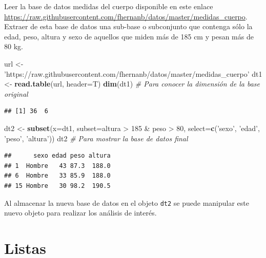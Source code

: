 \documentclass[10pt,]{krantz}
\makeatletter
\newenvironment{Shaded}{\begin{snugshade}}{\end{snugshade}}
\newcommand{\KeywordTok}[1]{\textcolor[rgb]{0.13,0.29,0.53}{\textbf{{#1}}}}
\newcommand{\DataTypeTok}[1]{\textcolor[rgb]{0.13,0.29,0.53}{{#1}}}
\newcommand{\DecValTok}[1]{\textcolor[rgb]{0.00,0.00,0.81}{{#1}}}
\newcommand{\StringTok}[1]{\textcolor[rgb]{0.31,0.60,0.02}{{#1}}}
\newcommand{\CommentTok}[1]{\textcolor[rgb]{0.56,0.35,0.01}{\textit{{#1}}}}
\newcommand{\NormalTok}[1]{{#1}}
\newenvironment{kframe}{%
\medskip{}
\setlength{\fboxsep}{.8em}
 \def\at@end@of@kframe{}%
 \ifinner\ifhmode%
  \def\at@end@of@kframe{\end{minipage}}%
  \begin{minipage}{\columnwidth}%
 \fi\fi%
 \def\FrameCommand##1{\hskip\@totalleftmargin \hskip-\fboxsep
 \colorbox{shadecolor}{##1}\hskip-\fboxsep
     \hskip-\linewidth \hskip-\@totalleftmargin \hskip\columnwidth}%
 \MakeFramed {\advance\hsize-\width
   \@totalleftmargin\z@ \linewidth\hsize
   \@setminipage}}%
 {\par\unskip\endMakeFramed%
 \at@end@of@kframe}
\renewenvironment{Shaded}{\begin{kframe}}{\end{kframe}}
\makeatother
\begin{document}
Leer la base de datos medidas del cuerpo disponible en este enlace
\url{https://raw.githubusercontent.com/fhernanb/datos/master/medidas_cuerpo}.
Extraer de esta base de datos una sub-base o subconjunto que contenga
sólo la edad, peso, altura y sexo de aquellos que miden más de 185 cm y
pesan más de 80 kg.

\begin{Shaded}
\begin{Highlighting}[]
\NormalTok{url <-}\StringTok{ 'https://raw.githubusercontent.com/fhernanb/datos/master/medidas_cuerpo'}
\NormalTok{dt1 <-}\StringTok{ }\KeywordTok{read.table}\NormalTok{(url, }\DataTypeTok{header=}\NormalTok{T)}
\KeywordTok{dim}\NormalTok{(dt1)  }\CommentTok{# Para conocer la dimensión de la base original}
\end{Highlighting}
\end{Shaded}

\begin{verbatim}
## [1] 36  6
\end{verbatim}

\begin{Shaded}
\begin{Highlighting}[]
\NormalTok{dt2 <-}\StringTok{ }\KeywordTok{subset}\NormalTok{(}\DataTypeTok{x=}\NormalTok{dt1, }\DataTypeTok{subset=}\NormalTok{altura >}\StringTok{ }\DecValTok{185} \NormalTok{&}\StringTok{ }\NormalTok{peso >}\StringTok{ }\DecValTok{80}\NormalTok{,}
              \DataTypeTok{select=}\KeywordTok{c}\NormalTok{(}\StringTok{'sexo'}\NormalTok{, }\StringTok{'edad'}\NormalTok{, }\StringTok{'peso'}\NormalTok{, }\StringTok{'altura'}\NormalTok{))}
\NormalTok{dt2  }\CommentTok{# Para mostrar la base de datos final}
\end{Highlighting}
\end{Shaded}

\begin{verbatim}
##      sexo edad peso altura
## 1  Hombre   43 87.3  188.0
## 6  Hombre   33 85.9  188.0
## 15 Hombre   30 98.2  190.5
\end{verbatim}

Al almacenar la nueva base de datos en el objeto \texttt{dt2} se puede
manipular este nuevo objeto para realizar los análisis de interés.

\section{\texorpdfstring{Listas 
}{Listas  }}\label{listas}
\end{document}
